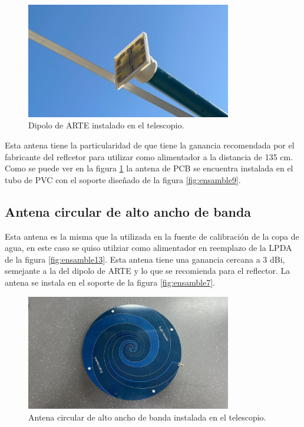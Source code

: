 \begin{figure}
    \centering
    \includegraphics[width=0.8\textwidth]{img/feed}
    \caption{Dipolo de ARTE instalado en el telescopio.}
    \label{fig:ensamble14}
\end{figure}

Esta antena tiene la particularidad de que tiene la ganancia recomendada por el fabricante del reflcetor para utilizar como alimentador a la distancia de 135 cm. Como se puede ver en la figura \ref{fig:ensamble14} la antena de PCB se encuentra instalada en el tubo de PVC con el soporte diseñado de la figura \ref{fig:ensamble9}.\\

\subsection{Antena circular de alto ancho de banda}

Esta antena es la misma que la utilizada en la fuente de calibración de la copa de agua, en este caso se quiso utilziar como alimentador en reemplazo de la LPDA de la figura \ref{fig:ensamble13}. Esta antena tiene una ganancia cercana a 3 dBi, semejante a la del dipolo de ARTE y lo que se recomienda para el reflector. La antena se instala en el soporte de la figura \ref{fig:ensamble7}.\\

\begin{figure}
    \centering
    \includegraphics[width=0.8\textwidth]{img/paletaFeed}
    \caption{Antena circular de alto ancho de banda instalada en el telescopio.}
    \label{fig:ensamble15}
\end{figure}


